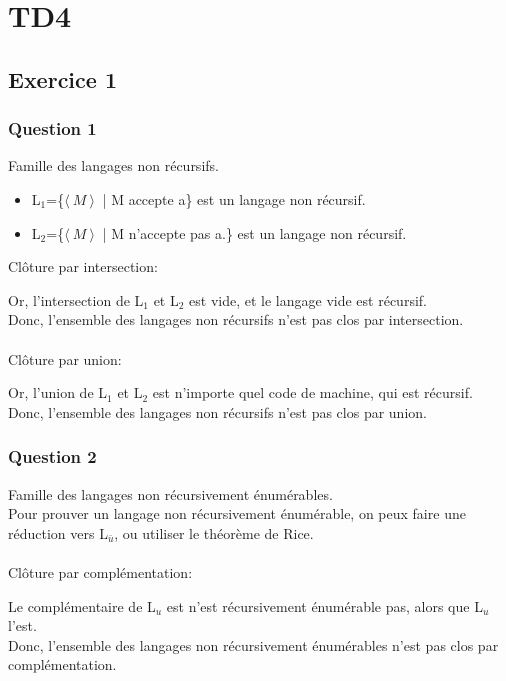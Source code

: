 \section{TD4}

\subsection{Exercice 1}

\subsubsection{Question 1}

Famille des langages non r\'ecursifs.

\begin{itemize}
  \item L$_1$=\{$\langle\ M\ \rangle \!\ $
  | M accepte a\} est un langage
  non r\'ecursif.
  \item L$_2$=\{$\langle\ M\ \rangle \!\ $
  | M n'accepte pas a.\} est un langage 
  non r\'ecursif.
\end{itemize}

Cl\^oture par intersection:

Or, l'intersection de L$_1$ et L$_2$
est vide, et le langage vide est
r\'ecursif.\\
Donc, l'ensemble des langages
non r\'ecursifs n'est pas clos par
intersection.\\\\

Cl\^oture par union:

Or, l'union de L$_1$ et L$_2$ est
n'importe quel code de machine, qui est
r\'ecursif.\\
Donc, l'ensemble des langages
non r\'ecursifs n'est pas clos par
union.

\subsubsection{Question 2}

Famille des langages
non r\'ecursivement \'enum\'erables.\\
Pour prouver un langage non
r\'ecursivement \'enum\'erable,
on peux faire une r\'eduction
vers L$_{\bar{u}}$, ou utiliser le
th\'eor\`eme de Rice.\\\\

Cl\^oture par compl\'ementation:

Le compl\'ementaire de L$_u$ est
n'est r\'ecursivement \'enum\'erable pas,
alors que L$_u$ l'est.\\
Donc, l'ensemble des langages
non r\'ecursivement \'enum\'erables
n'est pas clos par compl\'ementation.\\\\


